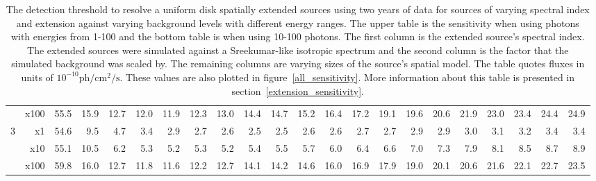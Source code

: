 \documentclass[12pt,preprint]{aastex}
\newcommand{\gev}{\text{GeV}\xspace}
\newcommand{\ph}{\text{ph}\xspace}
\newcommand{\cm}{\text{cm}\xspace}
\renewcommand{\sec}{\text{s}\xspace}
\begin{document}
\begin{appendices}
\begin{table}
\begin{centering}
\begin{tabular}{r|r|rrrrrrrrrrrrrrrrrrrr}
                 &     x100 &       55.5 &       15.9 &       12.7 &       12.0 &       11.9 &       12.3 &       13.0 &       14.4 &       14.7 &       15.2 &       16.4 &       17.2 &       19.1 &       19.6 &       20.6 &       21.9 &       23.0 &       23.4 &       24.4 &       24.9 \\
               3 &       x1 &       54.6 &        9.5 &        4.7 &        3.4 &        2.9 &        2.7 &        2.6 &        2.5 &        2.5 &        2.6 &        2.6 &        2.7 &        2.7 &        2.9 &        2.9 &        3.0 &        3.1 &        3.2 &        3.4 &        3.4 \\
                 &      x10 &       55.1 &       10.5 &        6.2 &        5.3 &        5.2 &        5.3 &        5.2 &        5.4 &        5.5 &        5.7 &        6.0 &        6.4 &        6.6 &        7.0 &        7.3 &        7.9 &        8.1 &        8.5 &        8.7 &        8.9 \\
                 &     x100 &       59.8 &       16.0 &       12.7 &       11.8 &       11.6 &       12.2 &       12.7 &       14.1 &       14.2 &       14.6 &       16.0 &       16.9 &       17.9 &       19.0 &       20.1 &       20.6 &       21.6 &       22.1 &       22.7 &       23.5 \\
        \hline
      \end{tabular}
      \caption{The detection threshold to resolve a uniform disk spatially
      extended sources using two years of data for sources of varying
      spectral index and extension against varying background levels
      with different energy ranges.  The upper table is the sensitivity
      when using photons with energies from 1-100 \gev and the bottom
      table is when using 10-100 \gev photons. The first column is
      the extended source's spectral index.  The extended sources
      were simulated against a Sreekumar-like isotropic spectrum and
      the second column is the factor that the simulated background
      was scaled by. The remaining columns are varying sizes of the
      source's spatial model. The table quotes fluxes in units of
      $10^{-10} \ph/\cm^2/\sec$.  These values are also plotted in
      figure~\ref{all_sensitivity}.  More information about this
      table is presented in section~\ref{extension_sensitivity}.
      }\label{all_sensitivity_table}
    \end{centering}
  \end{table}

\end{appendices}
\end{document}
